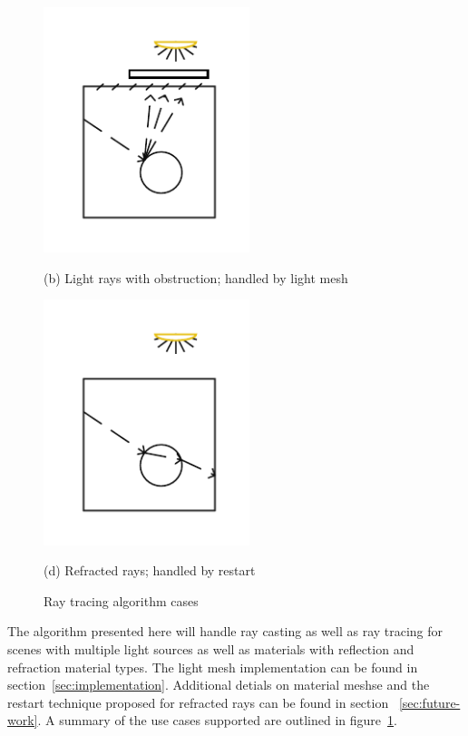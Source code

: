 \begin{figure}[!htb]
\endminipage\hfill
{}
  \includegraphics[width=6cm]{drawings/Case_2.pdf}
  
  (b) Light rays with obstruction; handled by light mesh
  
  \includegraphics[width=6cm]{drawings/Case_4.pdf}
  
  (d) Refracted rays; handled by restart
  
\endminipage
\caption{Ray tracing algorithm cases}
\label{fig:use-cases}
\end{figure}

The algorithm presented here will handle ray casting as well as ray tracing for
scenes with multiple light sources as well as materials with reflection and
refraction material types.  The light mesh implementation can be found in 
section~\ref{sec:implementation}.  Additional detials on material meshse and the 
restart technique proposed for refracted rays can be found in section
~\ref{sec:future-work}.  A summary of the use cases supported are outlined in
figure~\ref{fig:use-cases}.
















